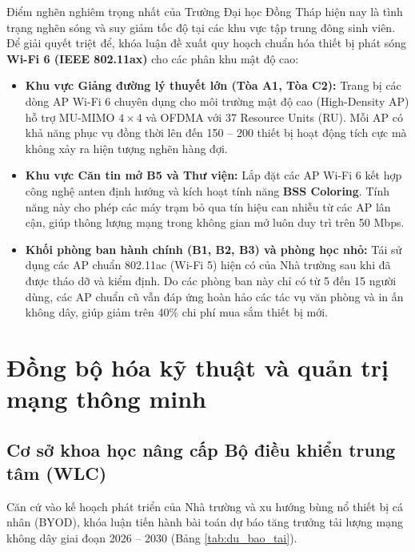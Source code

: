 Điểm nghẽn nghiêm trọng nhất của Trường Đại học Đồng Tháp hiện nay là tình trạng nghẽn sóng và suy giảm tốc độ tại các khu vực tập trung đông sinh viên. Để giải quyết triệt để, khóa luận đề xuất quy hoạch chuẩn hóa thiết bị phát sóng \textbf{Wi-Fi 6 (IEEE 802.11ax)} cho các phân khu mật độ cao:
\begin{itemize}
    \item \textbf{Khu vực Giảng đường lý thuyết lớn (Tòa A1, Tòa C2):} Trang bị các dòng AP Wi-Fi 6 chuyên dụng cho môi trường mật độ cao (High-Density AP) hỗ trợ MU-MIMO $4\times 4$ và OFDMA với 37 Resource Units (RU). Mỗi AP có khả năng phục vụ đồng thời lên đến 150 -- 200 thiết bị hoạt động tích cực mà không xảy ra hiện tượng nghẽn hàng đợi.
    \item \textbf{Khu vực Căn tin mở B5 và Thư viện:} Lắp đặt các AP Wi-Fi 6 kết hợp công nghệ anten định hướng và kích hoạt tính năng \textbf{BSS Coloring}. Tính năng này cho phép các máy trạm bỏ qua tín hiệu can nhiễu từ các AP lân cận, giúp thông lượng mạng trong không gian mở luôn duy trì trên 50 Mbps.
    \item \textbf{Khối phòng ban hành chính (B1, B2, B3) và phòng học nhỏ:} Tái sử dụng các AP chuẩn 802.11ac (Wi-Fi 5) hiện có của Nhà trường sau khi đã được tháo dỡ và kiểm định. Do các phòng ban này chỉ có từ 5 đến 15 người dùng, các AP chuẩn cũ vẫn đáp ứng hoàn hảo các tác vụ văn phòng và in ấn không dây, giúp giảm trên 40\% chi phí mua sắm thiết bị mới.
\end{itemize}

\section{Đồng bộ hóa kỹ thuật và quản trị mạng thông minh}

\subsection{Cơ sở khoa học nâng cấp Bộ điều khiển trung tâm (WLC)}

Căn cứ vào kế hoạch phát triển của Nhà trường và xu hướng bùng nổ thiết bị cá nhân (BYOD), khóa luận tiến hành bài toán dự báo tăng trưởng tải lượng mạng không dây giai đoạn 2026 -- 2030 (Bảng \ref{tab:du_bao_tai}).

